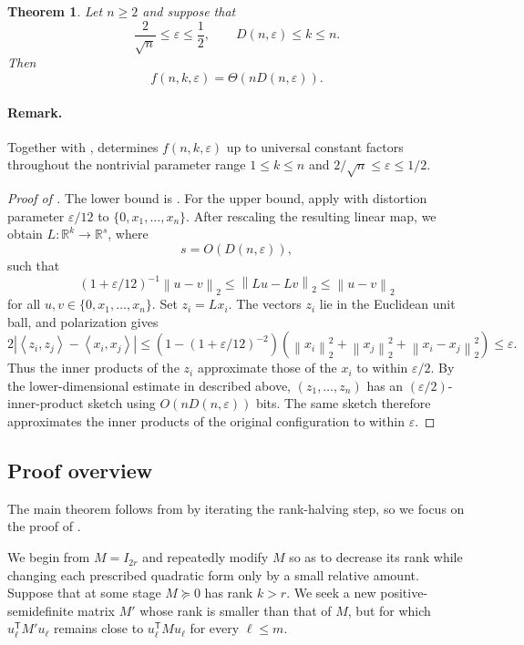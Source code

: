 \documentclass[11pt,reqno,letterpaper]{amsart}
\newtheorem{theorem}{Theorem}[section]
\newcommand{\R}{\mathbb R}
\newcommand{\norm}[1]{\left\lVert #1\right\rVert_2}
\newcommand{\abs}[1]{\left\lvert #1\right\rvert}
\newcommand{\ip}[2]{\left\langle #1,#2\right\rangle}
\newcommand{\Dfun}[2]{D(#1,#2)}
\begin{document}
\begin{theorem}
\label{thm:sketch-main}
Let $n\geq2$ and suppose that
\[
 \frac{2}{\sqrt n}\leq\varepsilon\leq\frac12,
 \qquad
 \Dfun{n}{\varepsilon}\leq k\leq n.
\]
Then
\[
 f(n,k,\varepsilon)
 =
 \Theta\left(
 n\Dfun{n}{\varepsilon}
 \right).
\]
\end{theorem}

\paragraph{\bf Remark.}
Together with \cite[Theorem~2.2]{AK},
 determines $f(n,k,\varepsilon)$ up to universal
constant factors throughout the nontrivial parameter range $1\leq k \leq n$ and $2/\sqrt{n} \leq \varepsilon \leq 1/2$. 

\begin{proof}[Proof of ]
The lower bound is \cite[Theorem~2.2]{AK}. For the upper bound, apply
 with distortion parameter $\varepsilon/12$ to
$\{0,x_1,\ldots,x_n\}$. After rescaling the resulting linear map, we
obtain $L:\R^k\to\R^s$, where
\[
 s=O(\Dfun{n}{\varepsilon}),
\]
such that
\[
 (1+\varepsilon/12)^{-1}\norm{u-v}
 \leq \norm{Lu-Lv}
 \leq \norm{u-v}
\]
for all $u,v\in\{0,x_1,\ldots,x_n\}$. Set $z_i=Lx_i$. The vectors $z_i$
lie in the Euclidean unit ball, and polarization gives
\[
 2\abs{\ip{z_i}{z_j}-\ip{x_i}{x_j}}
 \leq
 \left(1-(1+\varepsilon/12)^{-2}\right)
 \left(
 \norm{x_i}^2+\norm{x_j}^2+\norm{x_i-x_j}^2
 \right) \leq\varepsilon.
\]
Thus the inner products of the $z_i$ approximate those of the $x_i$ to
within $\varepsilon/2$. By the lower-dimensional estimate in \cite[Theorem~2.2]{AK} described
above, $(z_1,\ldots,z_n)$ has an $(\varepsilon/2)$-inner-product sketch
using $O(n\Dfun{n}{\varepsilon})$ bits. The same sketch therefore
approximates the inner products of the original configuration to within
$\varepsilon$.
\end{proof}




\subsection{Proof overview}
\label{sec:overview}

The main theorem follows from  by iterating the
rank-halving step, so we focus on the proof of .

We begin from $M=I_{2r}$ and repeatedly modify $M$ so as to decrease its
rank while changing each prescribed quadratic form only by a small
relative amount. Suppose that at some stage $M\succeq0$ has rank $k>r$.
We seek a new positive-semidefinite matrix $M'$ whose rank is smaller
than that of $M$, but for which
$
 u_\ell^{\mathsf T}M'u_\ell
$
remains close to $u_\ell^{\mathsf T}Mu_\ell$ for every $\ell\leq m$.
\end{document}
